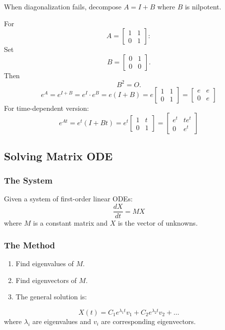 \documentclass[
]{article}
\providecommand{\tightlist}{%
  \setlength{\itemsep}{0pt}\setlength{\parskip}{0pt}}
\begin{document}
When diagonalization fails, decompose \(A = I + B\) where \(B\) is
nilpotent.

For
\[
A =
\begin{bmatrix}
1 & 1 \\
0 & 1
\end{bmatrix}:
\]
Set
\[
B =
\begin{bmatrix}
0 & 1 \\
0 & 0
\end{bmatrix}.
\]
Then
\[
B^2 = O.
\]
\[
e^A = e^{I+B} = e^I \cdot e^B = e(I + B) = e
\begin{bmatrix}
1 & 1 \\
0 & 1
\end{bmatrix} = \begin{bmatrix} e & e \\ 0 & e \end{bmatrix}
\]
For time-dependent version:
\[
e^{At} = e^t(I + Bt) = e^t
\begin{bmatrix}
1 & t \\
0 & 1
\end{bmatrix} = \begin{bmatrix} e^t & te^t \\ 0 & e^t \end{bmatrix}
\]

\subsection{Solving Matrix ODE}\label{solving-matrix-ode}

\subsubsection{The System}\label{the-system}

Given a system of first-order linear ODEs:
\[
\frac{dX}{dt} = MX
\]
where \(M\) is a constant matrix and \(X\) is the vector of unknowns.

\subsubsection{The Method}\label{the-method-7}

\begin{enumerate}
\def\labelenumi{\arabic{enumi}.}
\tightlist
\item
  Find eigenvalues of \(M\).
\item
  Find eigenvectors of \(M\).
\item
  The general solution is:
\end{enumerate}
\[
X(t) = C_1 e^{\lambda_1 t} v_1 + C_2 e^{\lambda_2 t} v_2 + \dots
\]
where \(\lambda_i\) are eigenvalues and \(v_i\) are corresponding
eigenvectors.
\end{document}
